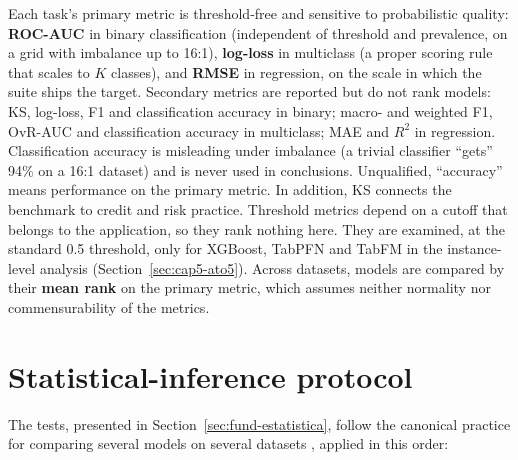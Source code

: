Each task's primary metric is threshold-free and sensitive to
probabilistic quality: \textbf{ROC-AUC} in binary classification
(independent of threshold and prevalence, on a grid with imbalance
up to 16:1), \textbf{log-loss} in multiclass (a proper scoring rule
that scales to $K$ classes), and \textbf{RMSE} in regression, on the
scale in which the suite ships the target. Secondary metrics are
reported but do not rank models: KS, log-loss, F1 and classification accuracy in binary; macro- and weighted F1, OvR-AUC and classification accuracy in multiclass; MAE and $R^2$ in regression. Classification accuracy is misleading under imbalance (a trivial classifier ``gets'' 94\% on a 16:1 dataset) and is never used in conclusions. Unqualified, ``accuracy'' means performance on the primary metric. In addition, KS connects the benchmark to
credit and risk practice. Threshold metrics depend on a cutoff that
belongs to the application, so they rank nothing here. They are
examined, at the standard 0.5 threshold, only for XGBoost, TabPFN
and TabFM in the instance-level analysis
(Section~\ref{sec:cap5-ato5}). Across datasets, models are compared
by their \textbf{mean rank} on the primary metric, which assumes
neither normality nor commensurability of the metrics.

\section{Statistical-inference protocol}
\label{sec:met-estatistica}

The tests, presented in Section~\ref{sec:fund-estatistica}, follow
the canonical practice for comparing several models on several
datasets \citep{demsar2006, benavoli2017}, applied in this order:

